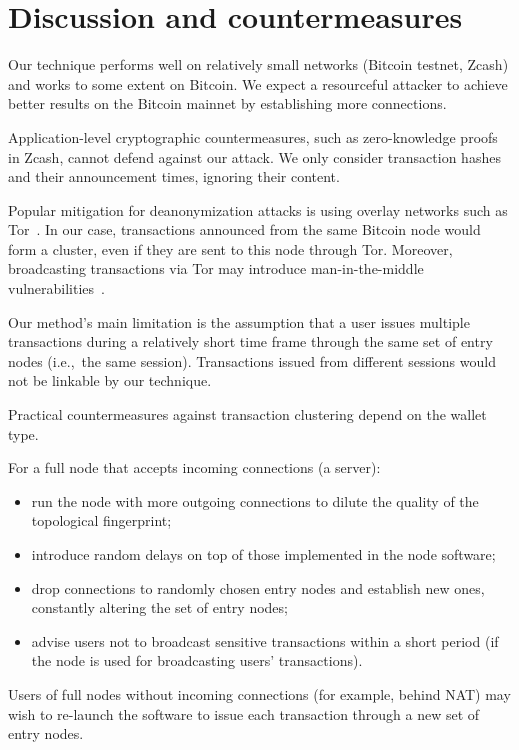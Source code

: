 \section{Discussion and countermeasures}

Our technique performs well on relatively small networks (Bitcoin testnet, Zcash) and works to some extent on Bitcoin.
We expect a resourceful attacker to achieve better results on the Bitcoin mainnet by establishing more connections.

Application-level cryptographic countermeasures, such as zero-knowledge proofs in Zcash, cannot defend against our attack.
We only consider transaction hashes and their announcement times, ignoring their content.

Popular mitigation for deanonymization attacks is using overlay networks such as Tor~\cite{Tor}.
In our case, transactions announced from the same Bitcoin node would form a cluster, even if they are sent to this node through Tor.
Moreover, broadcasting transactions via Tor may introduce man-in-the-middle vulnerabilities~\cite{Biryukov2015}.

Our method's main limitation is the assumption that a user issues multiple transactions during a relatively short time frame through the same set of entry nodes (i.e.,~the same session).
Transactions issued from different sessions would not be linkable by our technique.

Practical countermeasures against transaction clustering depend on the wallet type.

For a full node that accepts incoming connections (a server):

\begin{itemize}
	\item run the node with more outgoing connections to dilute the quality of the topological fingerprint;
	\item introduce random delays on top of those implemented in the node software;
	\item drop connections to randomly chosen entry nodes and establish new ones, constantly altering the set of entry nodes;
	\item advise users not to broadcast sensitive transactions within a short period (if the node is used for broadcasting users' transactions).
\end{itemize}

Users of full nodes without incoming connections (for example, behind NAT) may wish to re-launch the software to issue each transaction through a new set of entry nodes.


